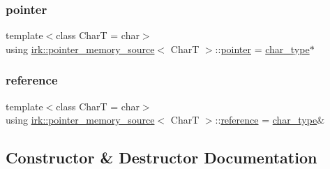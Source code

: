 \mbox{\label{classirk_1_1pointer__memory__source_aba722220e2243bb6ccc979f43ae159f6}} 
\subsubsection{\texorpdfstring{pointer}{pointer}}
{\footnotesize\ttfamily template$<$class CharT  = char$>$ \\
using \mbox{\hyperlink{classirk_1_1pointer__memory__source}{irk\+::pointer\+\_\+memory\+\_\+source}}$<$ CharT $>$\+::\mbox{\hyperlink{classirk_1_1pointer__memory__source_aba722220e2243bb6ccc979f43ae159f6}{pointer}} =  \mbox{\hyperlink{classirk_1_1pointer__memory__source_a4b778df8efee229fdafbd4de413dbf61}{char\+\_\+type}}$\ast$}

\mbox{\label{classirk_1_1pointer__memory__source_a6dd95b7b51c414d4fe531ee7375ac071}} 
\subsubsection{\texorpdfstring{reference}{reference}}
{\footnotesize\ttfamily template$<$class CharT  = char$>$ \\
using \mbox{\hyperlink{classirk_1_1pointer__memory__source}{irk\+::pointer\+\_\+memory\+\_\+source}}$<$ CharT $>$\+::\mbox{\hyperlink{classirk_1_1pointer__memory__source_a6dd95b7b51c414d4fe531ee7375ac071}{reference}} =  \mbox{\hyperlink{classirk_1_1pointer__memory__source_a4b778df8efee229fdafbd4de413dbf61}{char\+\_\+type}}\&}



\subsection{Constructor \& Destructor Documentation}
\mbox{\label{classirk_1_1pointer__memory__source_a30f9b1ac20116068b5e9daf8597f4f4b}} 

